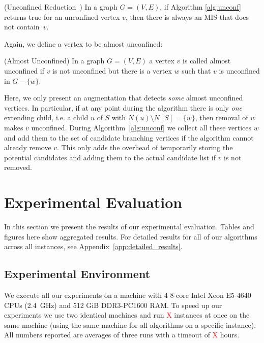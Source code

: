 \documentclass[a4paper,UKenglish,cleveref, autoref, thm-restate]{lipics-v2021}
\begin{document}
\begin{theorem}(Unconfined Reduction~\cite{XiaoUnconfined}) In a graph $G=(V,E)$,
  if Algorithm \ref{alg:unconf} returns true for an unconfined vertex $v$, then
  there is always an MIS that does not contain~$v$.
\end{theorem}

Again, we define a vertex to be almost unconfined:

\begin{definition} (Almost Unconfined)
  In a graph $G=(V,E)$ a vertex $v$ is called almost unconfined if $v$ is not unconfined but there is a vertex $w$ such that $v$ is unconfined in $G-\{w\}$.
\end{definition}

Here, we only present an augmentation that detects \emph{some} almost
unconfined vertices. In particular, if at any point during the algorithm there
is only \emph{one} extending child, i.e. a child $u$ of $S$ with $N(u)\setminus
N[S] = \{w\}$, then removal of $w$ makes $v$ unconfined. During
Algorithm~\ref{alg:unconf} we collect all these vertices $w$ and add them to the
set of candidate branching vertices if the algorithm cannot already remove $v$.
This only adds the overhead of temporarily storing the potential candidates and
adding them to the actual candidate list if $v$ is not removed.


\section{Experimental Evaluation}

In this section we present the results of our experimental evaluation. Tables
and figures here show aggregated results. For
detailed results for all of our algorithms across all instances, see Appendix~\ref{app:detailed_results}.

\subsection{Experimental Environment}
We execute all our experiments on a machine with 4 8-core Intel Xeon E5-4640 CPUs
(2.4~GHz) and 512 GiB DDR3-PC1600 RAM. To speed up our experiments we use two
identical machines and run \textcolor{red}{X} instances at once on the
same machine (using the same machine for all algorithms on a specific instance).
All numbers reported are averages  of three runs with
a timeout of \textcolor{red}{X} hours.
\end{document}
